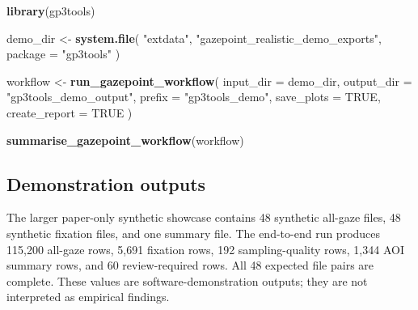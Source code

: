 \documentclass[
]{article}
\newenvironment{Shaded}{\begin{snugshade}}{\end{snugshade}}
\newcommand{\AttributeTok}[1]{\textcolor[rgb]{0.13,0.29,0.53}{#1}}
\newcommand{\ConstantTok}[1]{\textcolor[rgb]{0.56,0.35,0.01}{#1}}
\newcommand{\FunctionTok}[1]{\textcolor[rgb]{0.13,0.29,0.53}{\textbf{#1}}}
\newcommand{\NormalTok}[1]{#1}
\newcommand{\OtherTok}[1]{\textcolor[rgb]{0.56,0.35,0.01}{#1}}
\newcommand{\StringTok}[1]{\textcolor[rgb]{0.31,0.60,0.02}{#1}}
\begin{document}
\begin{Shaded}
\begin{Highlighting}[]
\FunctionTok{library}\NormalTok{(gp3tools)}

\NormalTok{demo\_dir }\OtherTok{\textless{}{-}} \FunctionTok{system.file}\NormalTok{(}
  \StringTok{"extdata"}\NormalTok{,}
  \StringTok{"gazepoint\_realistic\_demo\_exports"}\NormalTok{,}
  \AttributeTok{package =} \StringTok{"gp3tools"}
\NormalTok{)}

\NormalTok{workflow }\OtherTok{\textless{}{-}} \FunctionTok{run\_gazepoint\_workflow}\NormalTok{(}
  \AttributeTok{input\_dir =}\NormalTok{ demo\_dir,}
  \AttributeTok{output\_dir =} \StringTok{"gp3tools\_demo\_output"}\NormalTok{,}
  \AttributeTok{prefix =} \StringTok{"gp3tools\_demo"}\NormalTok{,}
  \AttributeTok{save\_plots =} \ConstantTok{TRUE}\NormalTok{,}
  \AttributeTok{create\_report =} \ConstantTok{TRUE}
\NormalTok{)}

\FunctionTok{summarise\_gazepoint\_workflow}\NormalTok{(workflow)}
\end{Highlighting}
\end{Shaded}

\subsection{Demonstration outputs}\label{demonstration-outputs}

The larger paper-only synthetic showcase contains 48 synthetic all-gaze
files, 48 synthetic fixation files, and one summary file. The end-to-end
run produces 115,200 all-gaze rows, 5,691 fixation rows, 192
sampling-quality rows, 1,344 AOI summary rows, and 60 review-required
rows. All 48 expected file pairs are complete. These values are
software-demonstration outputs; they are not interpreted as empirical
findings.
\end{document}
